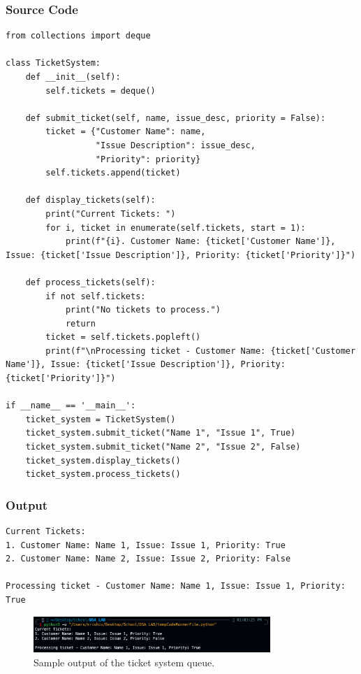\documentclass[a4paper,12pt]{article}
\begin{document}
\subsubsection*{Source Code}
\begin{lstlisting}
from collections import deque

class TicketSystem:
    def __init__(self):
        self.tickets = deque()

    def submit_ticket(self, name, issue_desc, priority = False):
        ticket = {"Customer Name": name, 
                  "Issue Description": issue_desc, 
                  "Priority": priority}
        self.tickets.append(ticket)

    def display_tickets(self):
        print("Current Tickets: ")
        for i, ticket in enumerate(self.tickets, start = 1):
            print(f"{i}. Customer Name: {ticket['Customer Name']}, Issue: {ticket['Issue Description']}, Priority: {ticket['Priority']}")

    def process_tickets(self):
        if not self.tickets:
            print("No tickets to process.")
            return
        ticket = self.tickets.popleft()
        print(f"\nProcessing ticket - Customer Name: {ticket['Customer Name']}, Issue: {ticket['Issue Description']}, Priority: {ticket['Priority']}")

if __name__ == '__main__':
    ticket_system = TicketSystem()
    ticket_system.submit_ticket("Name 1", "Issue 1", True)
    ticket_system.submit_ticket("Name 2", "Issue 2", False)
    ticket_system.display_tickets()
    ticket_system.process_tickets()
\end{lstlisting}

\subsubsection*{Output}
\begin{verbatim}
Current Tickets: 
1. Customer Name: Name 1, Issue: Issue 1, Priority: True
2. Customer Name: Name 2, Issue: Issue 2, Priority: False

Processing ticket - Customer Name: Name 1, Issue: Issue 1, Priority: True
\end{verbatim}

\begin{figure}[h]
    \centering
    \includegraphics[width=0.8\textwidth]{output_screenshot_exp3.png}
    \caption{Sample output of the ticket system queue.}
    \label{fig:output_exp3}
\end{figure}
\end{document}
